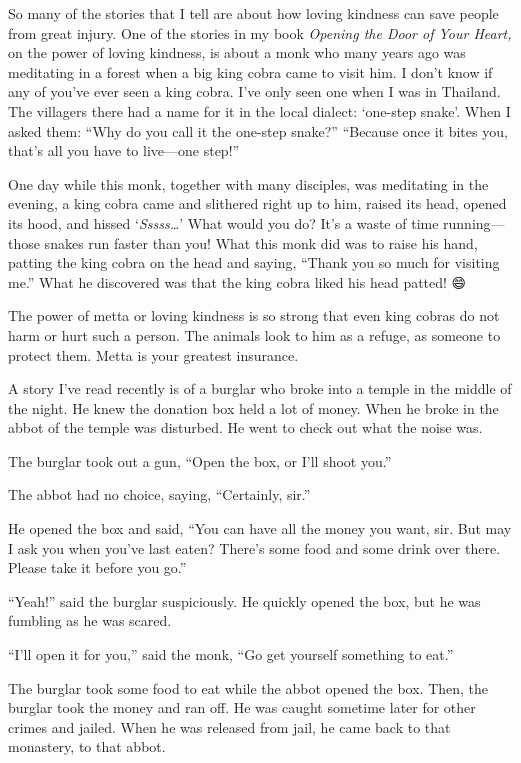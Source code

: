 \documentclass[12pt, openany]{book}
\begin{document}
So many of the stories that I tell are about how loving kindness can save people from great injury. One of the stories in my book \emph{Opening the Door of Your Heart,} on the power of loving kindness, is about a monk who many years ago was meditating in a forest when a big king cobra came to visit him. I don’t know if any of you’ve ever seen a king cobra. I’ve only seen one when I was in Thailand. The villagers there had a name for it in the local dialect: ‘one-step snake’. When I asked them: “Why do you call it the one-step snake?” “Because once it bites you, that’s all you have to live—one step!” 

One day while this monk, together with many disciples, was meditating in the evening, a king cobra came and slithered right up to him, raised its head, opened its hood, and hissed ‘\emph{Sssss…}’ What would you do? It’s a waste of time running—those snakes run faster than you! What this monk did was to raise his hand, patting the king cobra on the head and saying, “Thank you so much for visiting me.” What he discovered was that the king cobra liked his head patted! 😄

The power of metta or loving kindness is so strong that even king cobras do not harm or hurt such a person. The animals look to him as a refuge, as someone to protect them. Metta is your greatest insurance. 

A story I’ve read recently is of a burglar who broke into a temple in the middle of the night. He knew the donation box held a lot of money. When he broke in the abbot of the temple was disturbed. He went to check out what the noise was. 

The burglar took out a gun, “Open the box, or I’ll shoot you.” 

The abbot had no choice, saying, “Certainly, sir.” 

He opened the box and said, “You can have all the money you want, sir. But may I ask you when you’ve last eaten? There’s some food and some drink over there. Please take it before you go.” 

“Yeah!” said the burglar suspiciously. He quickly opened the box, but he was fumbling as he was scared. 

“I’ll open it for you,” said the monk, “Go get yourself something to eat.” 

The burglar took some food to eat while the abbot opened the box. Then, the burglar took the money and ran off. He was caught sometime later for other crimes and jailed. When he was released from jail, he came back to that monastery, to that abbot. 
\end{document}
